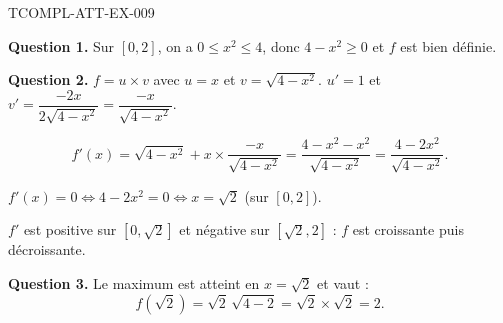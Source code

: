 \begin{corrige}{TCOMPL-ATT-EX-009}

\textbf{Question 1.} Sur $[0,2]$, on a $0 \leq x^2 \leq 4$, donc $4 - x^2 \geq 0$ et $f$ est bien définie.


\textbf{Question 2.} $f = u \times v$ avec $u=x$ et $v=\sqrt{4-x^2}$.
$u'=1$ et $v' = \dfrac{-2x}{2\sqrt{4-x^2}} = \dfrac{-x}{\sqrt{4-x^2}}$.

\[ f'(x) = \sqrt{4-x^2} + x \times \frac{-x}{\sqrt{4-x^2}} = \frac{4-x^2-x^2}{\sqrt{4-x^2}} = \frac{4-2x^2}{\sqrt{4-x^2}}. \]

$f'(x) = 0 \iff 4-2x^2 = 0 \iff x = \sqrt{2}$ (sur $[0,2]$).

$f'$ est positive sur $[0,\sqrt{2}]$ et négative sur $[\sqrt{2}, 2]$ : $f$ est croissante puis décroissante.

\textbf{Question 3.} Le maximum est atteint en $x = \sqrt{2}$ et vaut :
\[ f(\sqrt{2}) = \sqrt{2}\,\sqrt{4-2} = \sqrt{2} \times \sqrt{2} = \boxed{2}. \]

\end{corrige}
